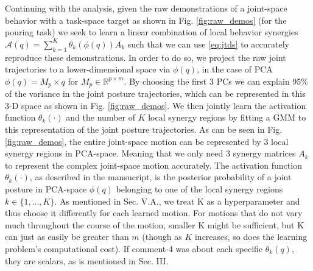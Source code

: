 \documentclass{article}
\begin{document}
\begin{enumerate}
Continuing with the analysis, given the raw demonstrations of a joint-space  behavior with a task-space target as shown in Fig. \ref{fig:raw_demos} (for the pouring task) we seek to learn a linear combination of local behavior synergies $\mathcal{A}(q) = \sum\limits_{k=1}^{K}\theta_k(\phi(q))A_k$ such that we can use \eqref{eq:jtds} to accurately reproduce these demonstrations. In order to do so, we project the raw joint trajectories to a lower-dimensional space via $\phi(q)$, in the case of PCA $\phi(q)=M_p \times q$ for $M_p \in \mathbb{R}^{p \times m}$. By choosing the first 3 PCs we can explain 95\% of the variance in the joint posture trajectories, which can be represented in this 3-D space as shown in Fig. \ref{fig:raw_demos}. We then jointly learn the activation function $\theta_k(\cdot)$ and the number of $K$ local synergy regions by fitting a GMM to this representation of the joint posture trajectories. As can be seen in Fig. \ref{fig:raw_demos}, the entire joint-space motion can be represented by 3 local synergy regions in PCA-space. Meaning that we only need 3 synergy matrices $A_k$ to represent the complex joint-space motion accurately. The activation function $\theta_k(\cdot)$, as described in the mansucript, is the posterior probability of a joint posture in PCA-space $\phi(q)$ belonging to one of the local synergy regions $k \in \{1,\dots,K\}$. As mentioned in Sec. V.A., we treat K as a hyperparameter and thus choose it differently for each learned motion. For motions that do not vary much throughout the course of the motion, smaller K might be sufficient, but K can just as easily be greater than $m$ (though as $K$ increases, so does the learning problem's computational cost). If comment-4 was about each specific $\theta_k(q)$, they are scalars, as is mentioned in Sec. III.



\end{enumerate}
\end{document}
